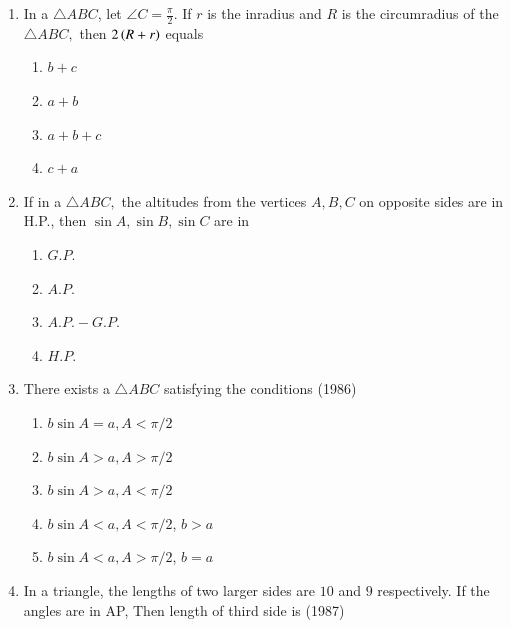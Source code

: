 \begin{enumerate}[label=\thesubsection.\arabic*,ref=\thesubsection.\theenumi]
\begin{multicols}{4}
\begin{enumerate}
\end{enumerate}
\end{multicols} 
%
\item In a $\triangle{ABC}$, let $\angle{C}=\frac{\pi}{2}.$ If $r$ is the inradius and $R$ is the circumradius of the $ \triangle{ABC},$ then $2\left(R+r\right)$ equals \hfill{}
\begin{multicols}{4}
\begin{enumerate}
        \item $b+c$                    
        \item $a+b$ 
        \item $a+b+c$ 
        \item $c+a$
\end{enumerate}
\end{multicols} 
%
\item If in a $\triangle ABC,$ the altitudes from the vertices ${A,B,C}$ on opposite sides are in H.P., then $\sin {A},\sin {B},\sin {C}$ are in \hfill{}
\begin{multicols}{4}
\begin{enumerate}
        \item $G.P.$                    
        \item $A.P.$ 
        \item $A.P.-G.P.$ 
        \item $H.P.$
\end{enumerate}
\end{multicols} 
%
    \item There exists a $\triangle ABC$ satisfying the conditions
    \hfill{(1986)}
\begin{multicols}{2}
    \begin{enumerate}
    	\item $b\sin{A} = a, A <\pi/2$
    	\item $b\sin{A} > a, A >\pi/2$
    	\item $b\sin{A} > a, A <\pi/2$
    	\item $b\sin{A} < a, A <\pi/2$, $b > a$
    	\item $b\sin{A} < a, A >\pi/2$, $b = a$
    \end{enumerate}
\end{multicols} 
    \item In a triangle, the lengths of two larger sides are $10$ and $9$ respectively. If the angles are in AP, Then length of third side is
    \hfill{(1987)}
    \begin{multicols}{2}
    	\begin{enumerate}

\end{enumerate}
\end{multicols}
\end{enumerate}
